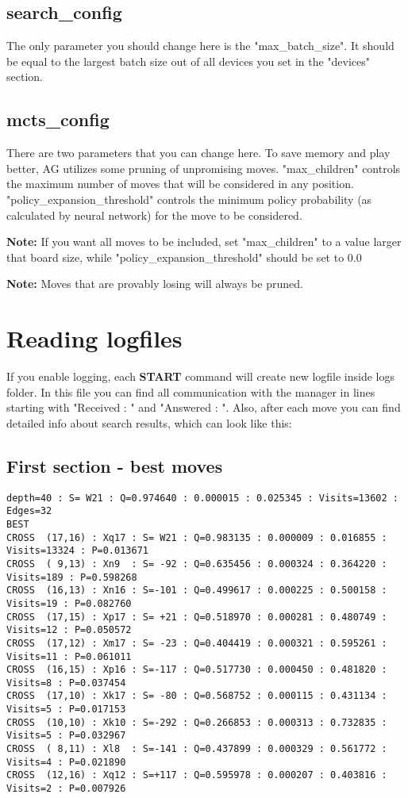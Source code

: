 \documentclass[12pt,a4paper]{article}
\begin{document}
\subsection{search{\_}config}
The only parameter you should change here is the "max{\_}batch{\_}size". It should be equal to the largest batch size out of all devices you set in the "devices" section.

\subsection{mcts{\_}config}
There are two parameters that you can change here. To save memory and play better, AG utilizes some pruning of unpromising moves. "max{\_}children" controls the maximum number of moves that will be considered in any position. "policy{\_}expansion{\_}threshold" controls the minimum policy probability (as calculated by neural network) for the move to be considered.

\textbf{Note:} If you want all moves to be included, set "max{\_}children" to a value larger that board size, while "policy{\_}expansion{\_}threshold" should be set to 0.0

\textbf{Note:} Moves that are provably losing will always be pruned.


\newpage
\section{Reading logfiles}
If you enable logging, each \textbf{START} command will create new logfile inside logs folder. In this file you can find all communication with the manager in lines starting with "Received : " and "Answered : ". Also, after each move you can find detailed info about search results, which can look like this:

\subsection{First section - best moves}
\begin{scriptsize}
\begin{verbatim}
depth=40 : S= W21 : Q=0.974640 : 0.000015 : 0.025345 : Visits=13602 : Edges=32
BEST
CROSS  (17,16) : Xq17 : S= W21 : Q=0.983135 : 0.000009 : 0.016855 : Visits=13324 : P=0.013671
CROSS  ( 9,13) : Xn9  : S= -92 : Q=0.635456 : 0.000324 : 0.364220 : Visits=189 : P=0.598268
CROSS  (16,13) : Xn16 : S=-101 : Q=0.499617 : 0.000225 : 0.500158 : Visits=19 : P=0.082760
CROSS  (17,15) : Xp17 : S= +21 : Q=0.518970 : 0.000281 : 0.480749 : Visits=12 : P=0.050572
CROSS  (17,12) : Xm17 : S= -23 : Q=0.404419 : 0.000321 : 0.595261 : Visits=11 : P=0.061011
CROSS  (16,15) : Xp16 : S=-117 : Q=0.517730 : 0.000450 : 0.481820 : Visits=8 : P=0.037454
CROSS  (17,10) : Xk17 : S= -80 : Q=0.568752 : 0.000115 : 0.431134 : Visits=5 : P=0.017153
CROSS  (10,10) : Xk10 : S=-292 : Q=0.266853 : 0.000313 : 0.732835 : Visits=5 : P=0.032967
CROSS  ( 8,11) : Xl8  : S=-141 : Q=0.437899 : 0.000329 : 0.561772 : Visits=4 : P=0.021890
CROSS  (12,16) : Xq12 : S=+117 : Q=0.595978 : 0.000207 : 0.403816 : Visits=2 : P=0.007926
\end{verbatim}
\end{scriptsize}
\end{document}
